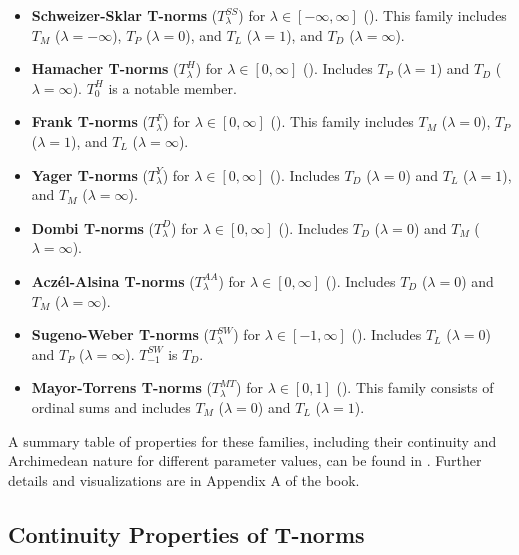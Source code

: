 \begin{itemize}
    \item \textbf{Schweizer-Sklar T-norms} ($T_\lambda^{SS}$) for $\lambda \in [-\infty, \infty]$ (\cite[Example 4.3, p.~104]{Klement2000}). This family includes $T_M$ ($\lambda=-\infty$), $T_P$ ($\lambda=0$), and $T_L$ ($\lambda=1$), and $T_D$ ($\lambda=\infty$).
    \item \textbf{Hamacher T-norms} ($T_\lambda^H$) for $\lambda \in [0, \infty]$ (\cite[Example 4.5, p.~106]{Klement2000}). Includes $T_P$ ($\lambda=1$) and $T_D$ ($\lambda=\infty$). $T_0^H$ is a notable member.
    \item \textbf{Frank T-norms} ($T_\lambda^F$) for $\lambda \in [0, \infty]$ (\cite[Example 4.7, p.~108]{Klement2000}). This family includes $T_M$ ($\lambda=0$), $T_P$ ($\lambda=1$), and $T_L$ ($\lambda=\infty$).
    \item \textbf{Yager T-norms} ($T_\lambda^Y$) for $\lambda \in [0, \infty]$ (\cite[Example 4.9, p.~110]{Klement2000}). Includes $T_D$ ($\lambda=0$) and $T_L$ ($\lambda=1$), and $T_M$ ($\lambda=\infty$).
    \item \textbf{Dombi T-norms} ($T_\lambda^D$) for $\lambda \in [0, \infty]$ (\cite[Example 4.11, p.~112]{Klement2000}). Includes $T_D$ ($\lambda=0$) and $T_M$ ($\lambda=\infty$).
    \item \textbf{Aczél-Alsina T-norms} ($T_\lambda^{AA}$) for $\lambda \in [0, \infty]$ (\cite[Example 4.15, p.~116]{Klement2000}). Includes $T_D$ ($\lambda=0$) and $T_M$ ($\lambda=\infty$).
    \item \textbf{Sugeno-Weber T-norms} ($T_\lambda^{SW}$) for $\lambda \in [-1, \infty]$ (\cite[Example 4.13, p.~114]{Klement2000}). Includes $T_L$ ($\lambda=0$) and $T_P$ ($\lambda=\infty$). $T_{-1}^{SW}$ is $T_D$.
    \item \textbf{Mayor-Torrens T-norms} ($T_\lambda^{MT}$) for $\lambda \in [0, 1]$ (\cite[Example 4.17, p.~118]{Klement2000}). This family consists of ordinal sums and includes $T_M$ ($\lambda=0$) and $T_L$ ($\lambda=1$).
\end{itemize}
A summary table of properties for these families, including their continuity and Archimedean nature for different parameter values, can be found in \cite[Table 4.1, p.~119]{Klement2000}. Further details and visualizations are in Appendix A of the book.

\subsection{Continuity Properties of T-norms}


